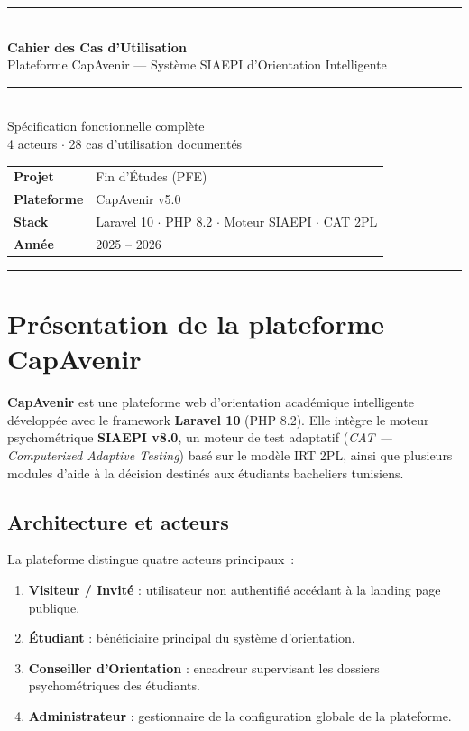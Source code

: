 \documentclass[a4paper,12pt]{article}
\begin{document}

\begin{titlepage}
  \centering
  \vspace*{2cm}
  {\color{capblue}\rule{\linewidth}{3pt}}\\[0.5em]
  {\Huge\bfseries\color{capdark} Cahier des Cas d'Utilisation}\\[0.6em]
  {\large\color{capblue} Plateforme CapAvenir --- Système SIAEPI d'Orientation Intelligente}\\[0.3em]
  {\color{caporange}\rule{\linewidth}{1.5pt}}\\[1.5em]
  {\large Spécification fonctionnelle complète}\\[0.3em]
  {\normalsize 4 acteurs $\cdot$ 28 cas d'utilisation documentés}\\[2em]
  \begin{tabular}{ll}
    \textbf{Projet}     & Fin d'Études (PFE) \\
    \textbf{Plateforme} & CapAvenir v5.0 \\
    \textbf{Stack}      & Laravel 10 $\cdot$ PHP 8.2 $\cdot$ Moteur SIAEPI $\cdot$ CAT 2PL \\
    \textbf{Année}      & 2025 -- 2026 \\
  \end{tabular}
  \vfill
  {\color{capblue}\rule{\linewidth}{3pt}}
\end{titlepage}

\tableofcontents
\newpage

\section{Présentation de la plateforme CapAvenir}

\textbf{CapAvenir} est une plateforme web d'orientation académique intelligente développée avec le framework \textbf{Laravel 10} (PHP 8.2). Elle intègre le moteur psychométrique \textbf{SIAEPI v8.0}, un moteur de test adaptatif (\textit{CAT --- Computerized Adaptive Testing}) basé sur le modèle IRT 2PL, ainsi que plusieurs modules d'aide à la décision destinés aux étudiants bacheliers tunisiens.

\subsection*{Architecture et acteurs}
La plateforme distingue quatre acteurs principaux~:
\begin{enumerate}
  \item \textbf{Visiteur / Invité} : utilisateur non authentifié accédant à la landing page publique.
  \item \textbf{Étudiant} : bénéficiaire principal du système d'orientation.
  \item \textbf{Conseiller d'Orientation} : encadreur supervisant les dossiers psychométriques des étudiants.
  \item \textbf{Administrateur} : gestionnaire de la configuration globale de la plateforme.
\end{enumerate}
\end{document}
